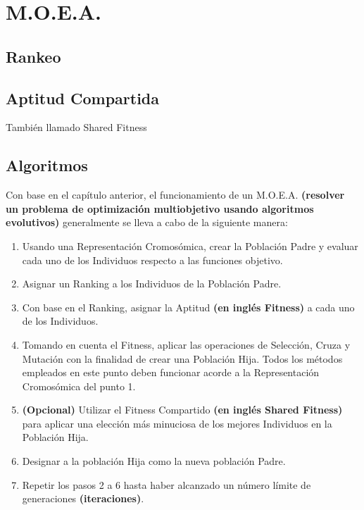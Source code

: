 \documentclass[class=report, crop=false]{standalone}
\begin{document}
\chapter {M.O.E.A.}




\section{Rankeo}

\section{Aptitud Compartida}  
También llamado Shared Fitness

\section{Algoritmos}
Con base en el capítulo anterior, el funcionamiento de un M.O.E.A. 
\textbf{(resolver un problema de optimización multiobjetivo usando 
algoritmos evolutivos)} generalmente se lleva a cabo de la siguiente 
manera:

\begin{enumerate}[1.]
\item Usando una Representación Cromosómica, crear la Población Padre y evaluar cada uno de los Individuos respecto a las funciones objetivo.

\item Asignar un Ranking a los Individuos de la Población Padre.  

\item Con base en el Ranking, asignar la Aptitud \textbf{(en inglés Fitness)} a cada uno de los Individuos.

\item Tomando en cuenta el Fitness, aplicar las operaciones de Selección, Cruza y Mutación con la finalidad de crear una Población Hija. Todos los métodos empleados en este punto deben funcionar acorde a la Representación Cromosómica del punto 1.

\item \textbf{(Opcional)} Utilizar el Fitness Compartido \textbf{(en inglés Shared Fitness)} para aplicar una elección más minuciosa de los mejores Individuos en la Población Hija. 

\item Designar a la población Hija como la nueva población Padre.

\item Repetir los pasos 2 a 6 hasta haber alcanzado un número límite de generaciones \textbf{(iteraciones)}. 
\end{enumerate}
\end{document}
